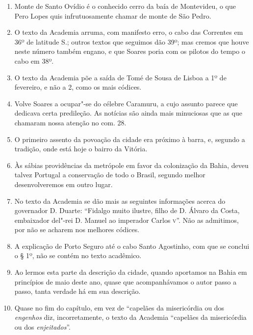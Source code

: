 \begin{enumerate}
\item Monte de Santo Ovídio é o conhecido cerro da baía de Montevideu, o que Pero 
Lopes quis infrutuosamente chamar de monte de São Pedro.

\item O texto da Academia arruma, com manifesto erro, o cabo das Correntes em 36º de 
latitude S.; outros textos que seguimos dão 39º; mas cremos que houve neste número 
também engano, e que Soares poria com os pilotos do tempo o cabo em 38º.

\item O texto da Academia põe a saída de Tomé de Sousa de Lisboa a 1º de fevereiro, e 
não a 2, como os mais códices.

\item  Volve Soares a ocupar"-se do célebre Caramuru, a cujo assunto parece
que dedicava certa predileção. As notícias são ainda mais minuciosas que
as que chamaram nossa atenção no com. 28.

\item O primeiro assento da povoação da cidade era próximo à barra, e, segundo a 
tradição, onde está hoje o bairro da Vitória.

\item Às sábias providências da metrópole em favor da colonização da Bahia, deveu 
talvez Portugal a conservação de todo o Brasil, segundo melhor desenvolveremos em 
outro lugar.

\item No texto da Academia se dão mais as seguintes informações acerca do governador 
D. Duarte: ``Fidalgo muito ilustre, filho de D. Álvaro da Costa, embaixador del"-rei D. 
Manuel ao imperador Carlos \textsc{v}''.  Não as admitimos, por não se acharem nos melhores 
códices.

\item A explicação de Porto Seguro até o cabo Santo Agostinho, com que se conclui o § 
1º, não se contém no texto acadêmico.

\item Ao lermos esta parte da descrição da cidade, quando aportamos na Bahia em 
princípios de maio deste ano, quase que acompanhávamos o autor passo a passo, tanta 
verdade há em sua descrição.

\item Quase no fim do capítulo, em vez de ``capelães da misericórdia ou dos \textit{engenhos} 
diz, incorretamente, o texto da Academia ``capelães da misericórdia  ou  dos  \textit{enjeitados}''. 


\end{enumerate}
